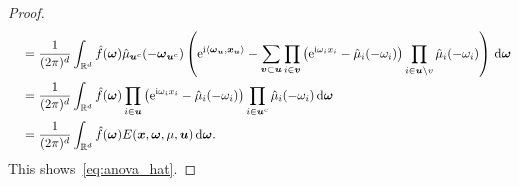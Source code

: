 \documentclass{article}
\renewcommand{\vec}[1]{\ensuremath \mathbf{\boldsymbol{#1}}}
\newcommand{\w}{\ensuremath{\vec \omega}}
\newcommand{\x}{\ensuremath{\vec x}}
\newcommand{\R}{\ensuremath{\mathbb{R}}}
\newcommand{\e}{\mathrm{e}}
\newcommand{\im}{\mathrm{i}}
\DeclareMathOperator*{\supp}{supp}
\renewcommand{\d}{\, \mathrm{d}}
\theoremstyle{definition}
\numberwithin{equation}{section}
\begin{document}
\begin{proof}
\begin{align*}
&\quad=\frac{1}{(2\pi)^d}\int_{\R^d}\hat f(\w)\hat{\mu}_{\vec u^c}(-\w_{\vec u^c}) \left(\e^{\im \langle \w_{\vec u},\vec x_{\vec u}\rangle}-\sum_{\vec v\subset \vec u} \prod_{i\in \vec v} \left(\e^{\im \omega_i x_i}- \hat{\mu}_i(-\omega_i)\right) \prod_{i \in \vec u\backslash v} \hat{\mu}_i(-\omega_i)\right) \d \w\\
&\quad=\frac{1}{(2\pi)^d}\int_{\R^d} \hat f(\w) \prod_{i\in \vec u} \left(\e^{\im \omega_i x_i}- \hat{\mu}_i(-\omega_i)\right) \prod_{i \in \vec u^c} \hat{\mu}_i(-\omega_i) \d \w\\
&\quad=\frac{1}{(2\pi)^d}\int_{\R^d} \hat f(\w) E(\x,\w,\mu,\vec u) \d \w.
\end{align*}
This shows~\eqref{eq:anova_hat}. 
\end{proof}
\end{document}
